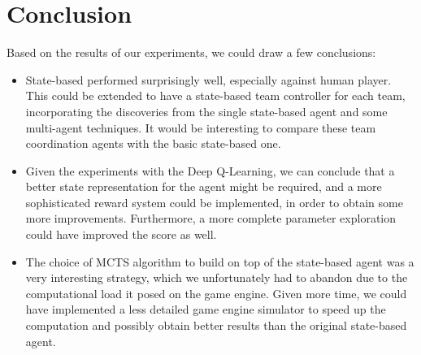 \documentclass{article}
\begin{document}
	
	\section{Conclusion}
	Based on the results of our experiments, we could draw a few conclusions:
	\begin{itemize}
	    \item State-based performed surprisingly well, especially against human player. This could be extended to have a state-based team controller for each team, incorporating the discoveries from the single state-based agent and some multi-agent techniques. It would be interesting to compare these team coordination agents with the basic state-based one.
	    \item Given the experiments with the Deep Q-Learning, we can conclude that a better state representation for the agent might be required, and a more sophisticated reward system could be implemented, in order to obtain some more improvements. Furthermore, a more complete parameter exploration could have improved the score as well.
	    \item The choice of MCTS algorithm to build on top of the state-based agent was a very interesting strategy, which we unfortunately had to abandon due to the computational load it posed on the game engine. Given more time, we could have implemented a less detailed game engine simulator to speed up the computation and possibly obtain better results than the original state-based agent.
	\end{itemize}
	
	
\end{document}
